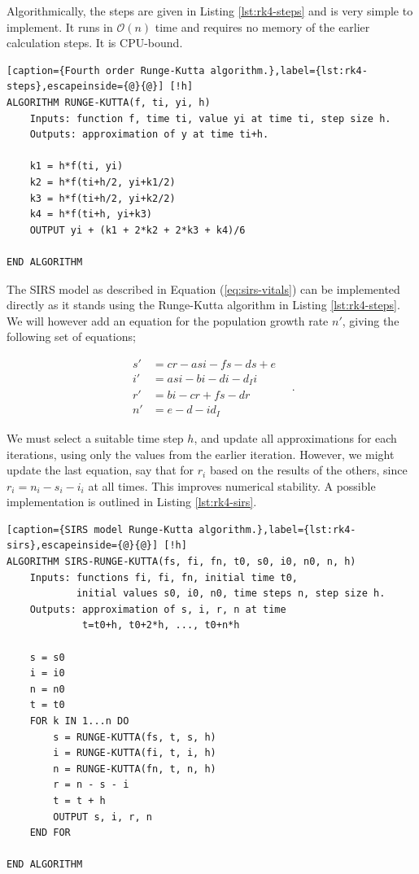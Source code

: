 \documentclass[]{article}
\begin{document}
Algorithmically, the steps are given in Listing \ref{lst:rk4-steps} and is very simple to implement. It runs in $\mathcal{O}(n)$ time and requires no memory of the earlier calculation steps. It is CPU-bound.

\begin{lstlisting}[caption={Fourth order Runge-Kutta algorithm.},label={lst:rk4-steps},escapeinside={@}{@}] [!h]
ALGORITHM RUNGE-KUTTA(f, ti, yi, h)
	Inputs: function f, time ti, value yi at time ti, step size h.
	Outputs: approximation of y at time ti+h.
	
	k1 = h*f(ti, yi)
	k2 = h*f(ti+h/2, yi+k1/2)
	k3 = h*f(ti+h/2, yi+k2/2)
	k4 = h*f(ti+h, yi+k3)
	OUTPUT yi + (k1 + 2*k2 + 2*k3 + k4)/6

END ALGORITHM
\end{lstlisting}

The SIRS model as described in Equation (\ref{eq:sirs-vitals}) can be implemented directly as it stands using the Runge-Kutta algorithm in Listing \ref{lst:rk4-steps}. We will however add an equation for the population growth rate $n'$, giving the following set of equations;

\begin{equation} \label{eq:sirs-rk4}
\begin{aligned}
	s' &= cr - asi - fs - ds + e \\
	i' &= asi - bi - di -d_Ii \\
	r' &= bi - cr + fs - dr \\
	n' &= e - d - id_I
\end{aligned} \quad .
\end{equation}

We must select a suitable time step $h$, and update all approximations for each iterations, using only the values from the earlier iteration. However, we might update the last equation, say that for $r_i$ based on the results of the others, since $r_i = n_i - s_i - i_i$ at all times. This improves numerical stability. A possible implementation is outlined in Listing \ref{lst:rk4-sirs}.

\begin{lstlisting}[caption={SIRS model Runge-Kutta algorithm.},label={lst:rk4-sirs},escapeinside={@}{@}] [!h]
ALGORITHM SIRS-RUNGE-KUTTA(fs, fi, fn, t0, s0, i0, n0, n, h)
	Inputs: functions fi, fi, fn, initial time t0, 
			initial values s0, i0, n0, time steps n, step size h.
	Outputs: approximation of s, i, r, n at time
			 t=t0+h, t0+2*h, ..., t0+n*h
	
	s = s0
	i = i0
	n = n0
	t = t0
	FOR k IN 1...n DO
		s = RUNGE-KUTTA(fs, t, s, h)
		i = RUNGE-KUTTA(fi, t, i, h)
		n = RUNGE-KUTTA(fn, t, n, h)
		r = n - s - i
		t = t + h
		OUTPUT s, i, r, n
	END FOR

END ALGORITHM
\end{lstlisting}
\end{document}
